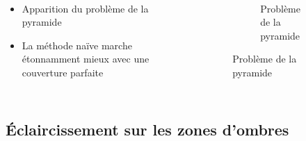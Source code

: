\begin{frame}[fragile=singleslide]{\insertsectionhead}
  \framesubtitle{\insertsubsectionhead}
  \begin{columns}[T,onlytextwidth]
      \vspace{1.3cm}
      \begin{itemize}
        \item Apparition du problème de la pyramide
        \vspace{.3cm}
        \item La méthode naïve marche étonnamment mieux avec une couverture parfaite
      \end{itemize}
    \begin{figure}
        \begin{subfigure}{.8\textwidth}
          \caption*{Problème de la pyramide}
        \end{subfigure}
      \end{figure}
  \end{columns}
\end{frame}

\subsection{Éclaircissement sur les zones d'ombres}

